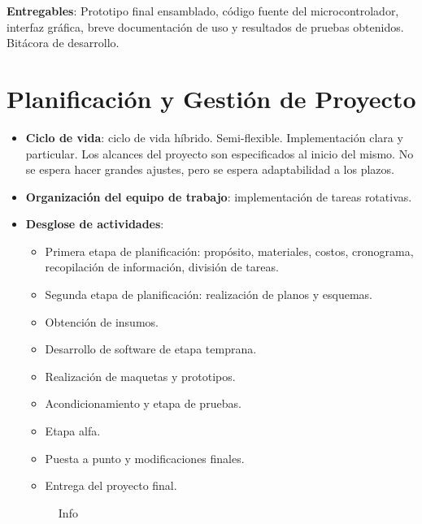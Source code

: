 \documentclass[a4paper,12pt]{article}
\begin{document}
\textbf{Entregables}: 
Prototipo final ensamblado, código fuente del microcontrolador, interfaz gráfica, breve documentación de uso y resultados de pruebas obtenidos. Bitácora de desarrollo.

\newpage
\section{Planificación y Gestión de Proyecto}

\begin{itemize}
    \item \textbf{Ciclo de vida}: ciclo de vida híbrido. Semi-flexible. Implementación clara y particular. Los alcances del proyecto son especificados al inicio del mismo. No se espera hacer grandes ajustes, pero se espera adaptabilidad a los plazos.
    \item \textbf{Organización del equipo de trabajo}: implementación de tareas rotativas.
    \item \textbf{Desglose de actividades}:
    \begin{itemize}
        \item Primera etapa de planificación: propósito, materiales, costos, cronograma, recopilación de información, división de tareas.
        \item Segunda etapa de planificación: realización de planos y esquemas.
        \item Obtención de insumos.
        \item Desarrollo de software de etapa temprana.
        \item Realización de maquetas y prototipos.
        \item Acondicionamiento y etapa de pruebas.
        \item Etapa alfa.
        \item Puesta a punto y modificaciones finales.
        \item Entrega del proyecto final.
    \end{itemize}

    \begin{figure}[h!]
        \centering
        \caption{Info \label{overflow}}
    \end{figure}


\end{itemize}
\end{document}

